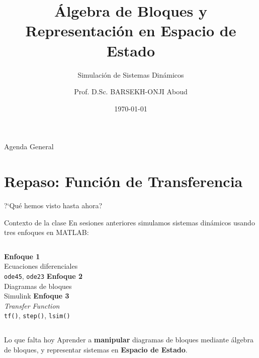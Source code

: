 \documentclass[aspectratio=169,xcolor=dvipsnames]{beamer}
\title{\'Algebra de Bloques y Representaci\'on en Espacio de Estado}
\subtitle{Simulaci\'on de Sistemas Din\'amicos}
\author{Prof. D.Sc. BARSEKH-ONJI Aboud}
\institute{
    Facultad de Ingenier\'ia \\
    Universidad An\'ahuac M\'exico
}
\date{\today}
\begin{document}
\begin{frame}
    \titlepage
\end{frame}

\begin{frame}{Agenda General}
    \tableofcontents
\end{frame}

\section{Repaso: Funci\'on de Transferencia}

\begin{frame}{?`Qu\'e hemos visto hasta ahora?}
    \begin{block}{Contexto de la clase}
        En sesiones anteriores simulamos sistemas din\'amicos usando tres enfoques en MATLAB:
    \end{block}
    \vspace{0.4em}
    \begin{columns}
        \centering
        \textbf{Enfoque 1}\\[0.4em]
        Ecuaciones diferenciales\\
        \texttt{ode45}, \texttt{ode23}
        \centering
        \textbf{Enfoque 2}\\[0.4em]
        Diagramas de bloques\\
        Simulink
        \centering
        \textbf{Enfoque 3}\\[0.4em]
        \textit{Transfer Function}\\
        \texttt{tf()}, \texttt{step()}, \texttt{lsim()}
    \end{columns}
    \vspace{0.5em}
    \begin{alertblock}{Lo que falta hoy}
        Aprender a \textbf{manipular} diagramas de bloques mediante \'algebra de bloques, y representar sistemas en \textbf{Espacio de Estado}.
    \end{alertblock}
\end{frame}
\end{document}
